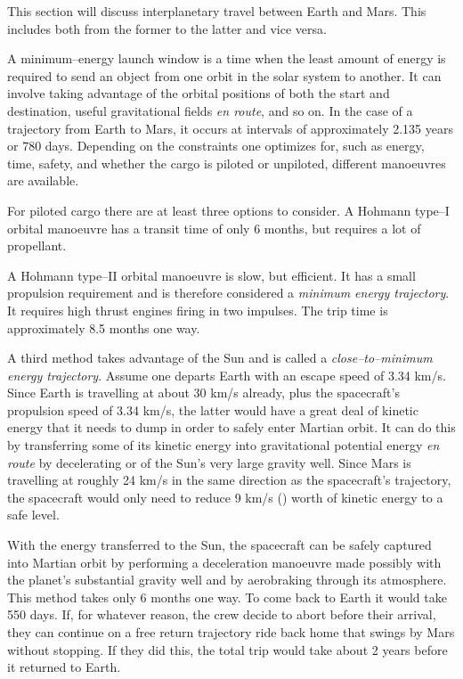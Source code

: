 

This section will discuss interplanetary travel between Earth and Mars. This includes both from the former to the latter and vice versa.


A minimum--energy launch window is a time when the least amount of energy is required to send an object from one orbit in the solar system to another. It can involve taking advantage of the orbital positions of both the start and destination, useful gravitational fields {\it en route}, and so on. In the case of a trajectory from Earth to Mars, it occurs at intervals of approximately 2.135 years or 780 days. Depending on the constraints one optimizes for, such as energy, time, safety, and whether the cargo is piloted or unpiloted, different manoeuvres are available.

For piloted cargo there are at least three options to consider. A Hohmann type--I orbital manoeuvre has a transit time of only 6 months, but requires a lot of propellant.

A Hohmann type--II orbital manoeuvre is slow, but efficient. It has a small propulsion requirement and is therefore considered a {\it minimum energy trajectory}. It requires high thrust engines firing in two impulses. The trip time is approximately 8.5 months one way.

A third method takes advantage of the Sun and is called a {\it close--to--minimum energy trajectory}. Assume one departs Earth with an escape speed of 3.34 km/s. Since Earth is travelling at about 30 km/s already, plus the spacecraft's propulsion speed of 3.34 km/s, the latter would have a great deal of kinetic energy that it needs to dump in order to safely enter Martian orbit. It can do this by transferring some of its kinetic energy into gravitational potential energy {\it en route} by decelerating or  of the Sun's very large gravity well. Since Mars is travelling at roughly 24 km/s in the same direction as the spacecraft's trajectory, the spacecraft would only need to reduce 9 km/s () worth of kinetic energy to a safe level. 

With the energy transferred to the Sun, the spacecraft can be safely captured into Martian orbit by performing a deceleration manoeuvre made possibly with the planet's substantial gravity well and by aerobraking through its atmosphere. This method takes only 6 months one way. To come back to Earth it would take 550 days. If, for whatever reason, the crew decide to abort before their arrival, they can continue on a free return trajectory ride back home that swings by Mars without stopping. If they did this, the total trip would take about 2 years before it returned to Earth.

